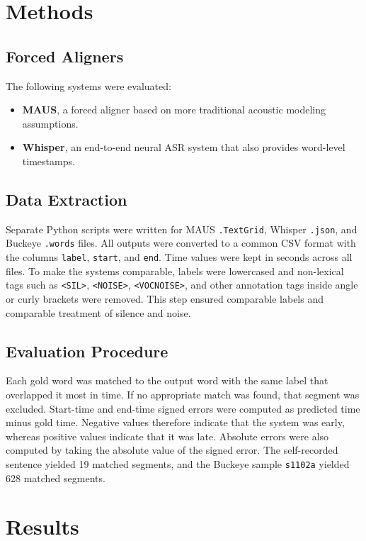 \documentclass[11pt]{article}
\begin{document}
\section{Methods}
\subsection{Forced Aligners}
The following systems were evaluated:
\begin{itemize}
    \item \textbf{MAUS}, a forced aligner based on more traditional acoustic modeling assumptions.
    \item \textbf{Whisper}, an end-to-end neural ASR system that also provides word-level timestamps.
\end{itemize}

\subsection{Data Extraction}
Separate Python scripts were written for MAUS \texttt{.TextGrid}, Whisper \texttt{.json}, and Buckeye \texttt{.words} files. All outputs were converted to a common CSV format with the columns \texttt{label}, \texttt{start}, and \texttt{end}. Time values were kept in seconds across all files. To make the systems comparable, labels were lowercased and non-lexical tags such as \texttt{<SIL>}, \texttt{<NOISE>}, \texttt{<VOCNOISE>}, and other annotation tags inside angle or curly brackets were removed. This step ensured comparable labels and comparable treatment of silence and noise.

\subsection{Evaluation Procedure}
Each gold word was matched to the output word with the same label that overlapped it most in time. If no appropriate match was found, that segment was excluded. Start-time and end-time signed errors were computed as predicted time minus gold time. Negative values therefore indicate that the system was early, whereas positive values indicate that it was late. Absolute errors were also computed by taking the absolute value of the signed error. The self-recorded sentence yielded 19 matched segments, and the Buckeye sample \texttt{s1102a} yielded 628 matched segments.

\section{Results}
\end{document}
